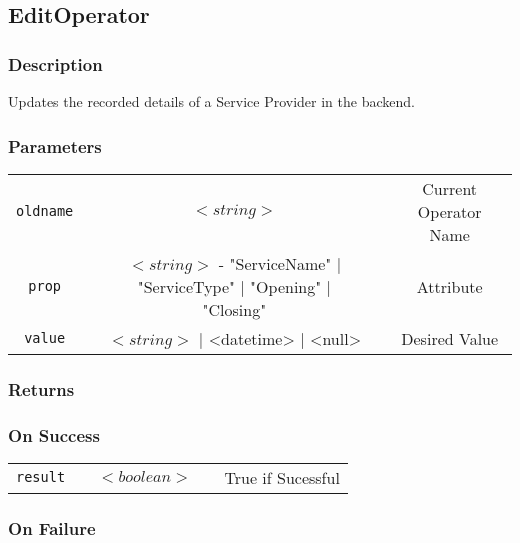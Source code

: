 \documentclass[a4paper,12pt]{article}
\begin{document}
\subsection{EditOperator}

\subsubsection{Description}

Updates the recorded details of a Service Provider in the backend.

\subsubsection{Parameters}

\begin{tabular}{ccccc}
\verb!oldname! & \vspace{15mm} & $<string>$ & \vspace{15mm} & Current Operator Name \\
\verb!prop! & \vspace{15mm} & $<string>$ - "ServiceName" | "ServiceType" |
"Opening" | "Closing"& \vspace{15mm} & Attribute  \\
\verb!value! & \vspace{15mm} & $<string>$ | <datetime> | <null> & \vspace{15mm} & Desired Value \\
\end{tabular}

\subsubsection{Returns}

\subsubsection{On Success}

\begin{tabular}{ccccc}
\verb!result! & \vspace{15mm} & $<boolean>$ & \vspace{15mm} & True if Sucessful \\
\end{tabular}

\subsubsection{On Failure}
\end{document}
